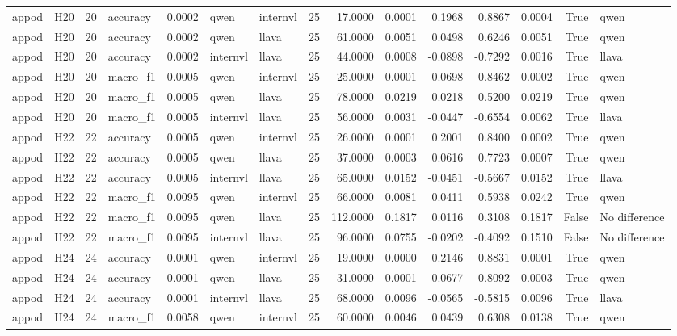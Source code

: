\begin{table}[tbp]
\begin{tabular}{llrlrllrrrrrrrl}
appod & H20 & 20 & accuracy & 0.0002 & qwen & internvl & 25 & 17.0000 & 0.0001 & 0.1968 & 0.8867 & 0.0004 & True & qwen \\
appod & H20 & 20 & accuracy & 0.0002 & qwen & llava & 25 & 61.0000 & 0.0051 & 0.0498 & 0.6246 & 0.0051 & True & qwen \\
appod & H20 & 20 & accuracy & 0.0002 & internvl & llava & 25 & 44.0000 & 0.0008 & -0.0898 & -0.7292 & 0.0016 & True & llava \\
appod & H20 & 20 & macro\_f1 & 0.0005 & qwen & internvl & 25 & 25.0000 & 0.0001 & 0.0698 & 0.8462 & 0.0002 & True & qwen \\
appod & H20 & 20 & macro\_f1 & 0.0005 & qwen & llava & 25 & 78.0000 & 0.0219 & 0.0218 & 0.5200 & 0.0219 & True & qwen \\
appod & H20 & 20 & macro\_f1 & 0.0005 & internvl & llava & 25 & 56.0000 & 0.0031 & -0.0447 & -0.6554 & 0.0062 & True & llava \\
appod & H22 & 22 & accuracy & 0.0005 & qwen & internvl & 25 & 26.0000 & 0.0001 & 0.2001 & 0.8400 & 0.0002 & True & qwen \\
appod & H22 & 22 & accuracy & 0.0005 & qwen & llava & 25 & 37.0000 & 0.0003 & 0.0616 & 0.7723 & 0.0007 & True & qwen \\
appod & H22 & 22 & accuracy & 0.0005 & internvl & llava & 25 & 65.0000 & 0.0152 & -0.0451 & -0.5667 & 0.0152 & True & llava \\
appod & H22 & 22 & macro\_f1 & 0.0095 & qwen & internvl & 25 & 66.0000 & 0.0081 & 0.0411 & 0.5938 & 0.0242 & True & qwen \\
appod & H22 & 22 & macro\_f1 & 0.0095 & qwen & llava & 25 & 112.0000 & 0.1817 & 0.0116 & 0.3108 & 0.1817 & False & No difference \\
appod & H22 & 22 & macro\_f1 & 0.0095 & internvl & llava & 25 & 96.0000 & 0.0755 & -0.0202 & -0.4092 & 0.1510 & False & No difference \\
appod & H24 & 24 & accuracy & 0.0001 & qwen & internvl & 25 & 19.0000 & 0.0000 & 0.2146 & 0.8831 & 0.0001 & True & qwen \\
appod & H24 & 24 & accuracy & 0.0001 & qwen & llava & 25 & 31.0000 & 0.0001 & 0.0677 & 0.8092 & 0.0003 & True & qwen \\
appod & H24 & 24 & accuracy & 0.0001 & internvl & llava & 25 & 68.0000 & 0.0096 & -0.0565 & -0.5815 & 0.0096 & True & llava \\
appod & H24 & 24 & macro\_f1 & 0.0058 & qwen & internvl & 25 & 60.0000 & 0.0046 & 0.0439 & 0.6308 & 0.0138 & True & qwen \\

\end{tabular}
\end{table}
